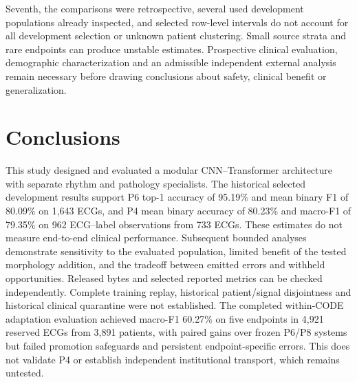 \documentclass[life,article,submit,moreauthors]{Definitions/mdpi}
\begin{document}
Seventh, the comparisons were retrospective, several used development populations already inspected, and selected row-level intervals do not account for all development selection or unknown patient clustering. Small source strata and rare endpoints can produce unstable estimates. Prospective clinical evaluation, demographic characterization and an admissible independent external analysis remain necessary before drawing conclusions about safety, clinical benefit or generalization.

\section{Conclusions}


This study designed and evaluated a modular CNN--Transformer architecture with separate rhythm and pathology specialists. The historical selected development results support P6 top-1 accuracy of 95.19\% and mean binary F1 of 80.09\% on 1,643 ECGs, and P4 mean binary accuracy of 80.23\% and macro-F1 of 79.35\% on 962 ECG--label observations from 733 ECGs. These estimates do not measure end-to-end clinical performance. Subsequent bounded analyses demonstrate sensitivity to the evaluated population, limited benefit of the tested morphology addition, and the tradeoff between emitted errors and withheld opportunities. Released bytes and selected reported metrics can be checked independently. Complete training replay, historical patient/signal disjointness and historical clinical quarantine were not established. The completed within-CODE adaptation evaluation achieved macro-F1 60.27\% on five endpoints in 4,921 reserved ECGs from 3,891 patients, with paired gains over frozen P6/P8 systems but failed promotion safeguards and persistent endpoint-specific errors. This does not validate P4 or establish independent institutional transport, which remains untested.



\end{document}
